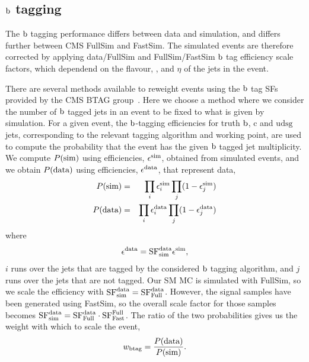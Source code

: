 \subsection{\texorpdfstring{$\mathrm{b}$}{b} tagging} 

The $\mathrm{b}$ tagging performance differs between data and simulation, and differs further between 
CMS FullSim and FastSim.  
The simulated events are therefore corrected by applying data/FullSim and FullSim/FastSim $\mathrm{b}$
tag efficiency scale factors, which dependend on the flavour, \pt, and $\eta$ of the jets in the
event. 

There are several methods available to reweight events using the $\mathrm{b}$ tag SFs provided by the CMS
BTAG group~\cite{BTagSF1}. 
Here we choose a method where we consider the number of $\mathrm{b}$ tagged jets in an event to be fixed
to what is given by simulation.  
For a given event, the $\mathrm{b}$-tagging efficiencies for truth $\mathrm{b}$, $\mathrm{c}$ and
$\mathrm{udsg}$ jets, corresponding to the relevant tagging algorithm and working point, are used to
compute the probability that the event has the given $\mathrm{b}$ tagged jet multiplicity. 
We compute $P({\rm sim})$ using efficiencies, $\epsilon^{\rm sim}$, obtained from simulated events,
and we obtain $P(\rm data)$ using efficiencies, $\epsilon^{\rm data}$, that represent data,
\begin{eqnarray}
P(\rm sim) & = & \prod_{i} \epsilon_i^{\rm sim} \prod_{j} (1 - \epsilon_j^{\rm sim}) \\
P(\rm data) & = & \prod_{i} \epsilon_i^{\rm data} \prod_{j} (1 - \epsilon_j^{\rm data})
\end{eqnarray}
where
\begin{equation}
\epsilon^{\rm data} = {\rm SF}^{\rm data}_{\rm sim} \epsilon^{\rm sim} ,
\end{equation}
$i$ runs over the jets that are tagged by the considered $\mathrm{b}$ tagging algorithm, and $j$
runs over the jets that are not tagged.
Our SM MC is simulated with FullSim, so we scale the efficiency with ${\rm SF}^{\rm data}_{\rm sim}
= {\rm SF}^{\rm data}_{\rm Full}$.  
However, the signal samples have been generated using FastSim, so the overall scale factor for
those samples becomes 
${\rm SF}^{\rm data}_{\rm  sim} = {\rm SF}^{\rm data}_{\rm Full} \cdot {\rm SF}^{\rm Full}_{\rm
Fast}$.
The ratio of the two probabilities gives us the weight with which to scale the event,
\begin{equation}
w_{\rm btag} = \frac{P(\rm data)}{P(\rm sim)} .
\end{equation}

